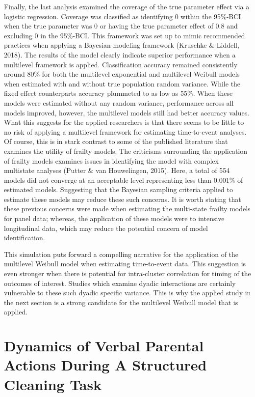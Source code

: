 \documentclass[12pt]{./styles/outhesis}
\begin{document}
Finally, the last analysis examined the coverage of the true parameter
effect via a logistic regression. Coverage was classified as identifying
0 within the 95\%-BCI when the true parameter was 0 or having the true
parameter effect of 0.8 and excluding 0 in the 95\%-BCI. This framework
was set up to mimic recommended practices when applying a Bayesian
modeling framework (Kruschke \& Liddell, 2018). The results of the model
clearly indicate superior performance when a multilevel framework is
applied. Classification accuracy remained consistently around 80\% for
both the multilevel exponential and multilevel Weibull models when
estimated with and without true population random variance. While the
fixed effect counterparts accuracy plummeted to as low as 55\%. When
these models were estimated without any random variance, performance
across all models improved, however, the multilevel models still had
better accuracy values. What this suggests for the applied researchers
is that there seems to be little to no risk of applying a multilevel
framework for estimating time-to-event analyses. Of course, this is in
stark contrast to some of the published literature that examines the
utility of frailty models. The criticisms surrounding the application of
frailty models examines issues in identifying the model with complex
multistate analyses (Putter \& van Houwelingen, 2015). Here, a total of
554 models did not converge at an acceptable level representing less
than 0.001\% of estimated models. Suggesting that the Bayesian sampling
criteria applied to estimate these models may reduce these such
concerns. It is worth stating that these previous concerns were made
when estimating the multi-state frailty models for panel data; whereas,
the application of these models were to intensive longitudinal data,
which may reduce the potential concern of model identification.

This simulation puts forward a compelling narrative for the application
of the multilevel Weibull model when estimating time-to-event data. This
suggestion is even stronger when there is potential for intra-cluster
correlation for timing of the outcomes of interest. Studies which
examine dyadic interactions are certainly vulnerable to these such
dyadic specific variance. This is why the applied study in the next
section is a strong candidate for the multilevel Weibull model that is
applied.


\chapter{Dynamics of Verbal Parental Actions During A Structured Cleaning Task}\label{chap:Emp} 
\end{document}

